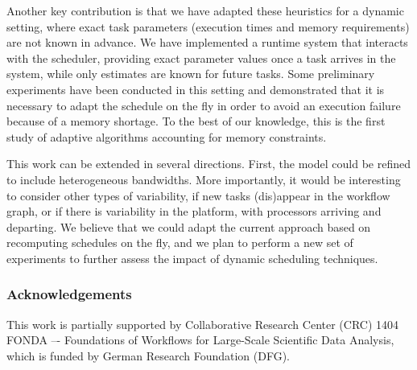 \documentclass[conference]{IEEEtran}
\newcommand{\algo}[1]{\textsc{#1}}
\newcommand{\heftmm}{\algo{HEFTM-MM}\xspace}
\newcommand{\heftbl}{\algo{HEFTM-BL}\xspace}
\newcommand{\heftblc}{\algo{HEFTM-BLC}\xspace}
\begin{document}
%

Another key contribution is that we have adapted these heuristics for a dynamic setting, where exact
task parameters (execution times and memory requirements) are not known in advance. 
We have implemented a runtime system that interacts with the scheduler, providing exact
parameter values once a task arrives in the system, while only estimates are known for future tasks. 
Some preliminary experiments have been conducted in this setting and demonstrated that
it is necessary to adapt the schedule on the fly in order to avoid an execution failure because
of a memory shortage. To the best of our knowledge, this is the first study of adaptive
algorithms accounting for memory constraints. 

This work can be extended in several directions. First, the model could be refined to include
heterogeneous bandwidths. %
More importantly, it would be interesting to consider other types of variability, \egc
if new tasks (dis)appear in the workflow graph, or if there is variability in the platform, 
with processors arriving and departing. We believe that we could adapt the current approach
based on recomputing schedules on the fly, and we plan to perform a new set of experiments
to further assess the impact of dynamic scheduling techniques. 


\subsubsection*{Acknowledgements}
This work is partially supported by Collaborative Research Center (CRC) 1404 FONDA
–- Foundations of Workflows for Large-Scale Scientific Data Analysis, which is funded
by German Research Foundation (DFG).


\balance
    
\end{document}
